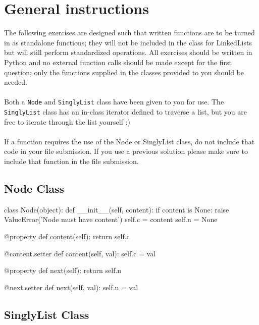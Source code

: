 \documentclass{42-en}
\begin{document}
\chapter{General instructions}
    The following exercises are designed such that written functions are
    to be turned in as standalone functions; they will not be included
    in the class for LinkedLists but will still perform standardized
    operations. All exercises should be written in Python and no external
    function calls should be made except for the first question; only the
    functions supplied in the classes provided to you should be needed.\\
    \\
    Both a \texttt{Node} and \texttt{SinglyList} class have been given to
    you for use. The \texttt{SinglyList} class has an in-class iterator defined to
    traverse a list, but you are free to iterate through the list yourself :)\\
    \\
    If a function requires the use of the Node or SinglyList class, do not 
    include that code in your file submission. If you use a previous solution
    please make sure to include that function in the file submission.

\newpage
    \section{Node Class}

        \begin{42pycode}
class Node(object):
    def __init__(self, content):
        if content is None:
            raise ValueError('Node must have content')
        self.c = content
        self.n = None
    
    @property
    def content(self):
        return self.c

    @content.setter
    def content(self, val):
        self.c = val
    
    @property
    def next(self):
        return self.n
    
    @next.setter
    def next(self, val):
        self.n = val
\end{42pycode}

    \section{SinglyList Class}
\end{document}
